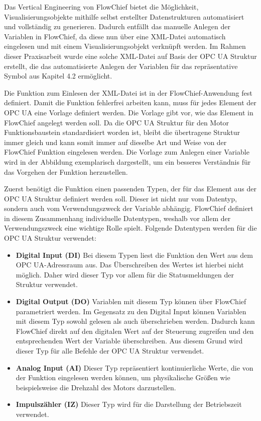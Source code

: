 Das Vertical Engineering von FlowChief bietet die Möglichkeit, Visualisierungsobjekte mithilfe selbst erstellter Datenstrukturen automatisiert und vollständig zu generieren. Dadurch entfällt das manuelle Anlegen der Variablen in FlowChief, da diese nun über eine XML-Datei automatisch eingelesen und mit einem Visualisierungsobjekt verknüpft werden. Im Rahmen dieser Praxisarbeit wurde eine solche XML-Datei auf Basis der OPC UA Struktur erstellt, die das automatisierte Anlegen der Variablen für das repräsentative Symbol aus Kapitel 4.2 ermöglicht.

Die Funktion zum Einlesen der XML-Datei ist in der FlowChief-Anwendung fest definiert. Damit die Funktion fehlerfrei arbeiten kann, muss für jedes Element der OPC UA eine Vorlage definiert werden. Die Vorlage gibt vor, wie das Element in FlowChief angelegt werden soll. Da die OPC UA Struktur für den Motor Funktionsbaustein standardisiert worden ist, bleibt die übertragene Struktur immer gleich und kann somit immer auf dieselbe Art und Weise von der FlowChief Funktion eingelesen werden. Die Vorlage zum Anlegen einer Variable wird in der Abbildung exemplarisch dargestellt, um ein besseres Verständnis für das Vorgehen der Funktion herzustellen. 

Zuerst benötigt die Funktion einen passenden Typen, der für das Element aus der OPC UA Struktur definiert werden soll. Dieser ist nicht nur vom Datentyp, sondern auch vom Verwendungszweck der Variable abhängig. FlowChief definiert in diesem Zusammenhang individuelle Datentypen, weshalb vor allem der Verwendungszweck eine wichtige Rolle spielt. Folgende Datentypen werden für die OPC UA Struktur verwendet:

\begin{itemize}
	\item \textbf{Digital Input (DI)} Bei diesem Typen liest die Funktion den Wert aus dem OPC UA-Adressraum aus. Das Überschreiben des Wertes ist hierbei nicht möglich. Daher wird dieser Typ vor allem für die Statusmeldungen der Struktur verwendet.
	\item \textbf{Digital Output (DO)} Variablen mit diesem Typ können über FlowChief parametriert werden. Im Gegensatz zu den Digital Input können Variablen mit diesem Typ sowohl gelesen als auch überschrieben werden. Dadurch kann FlowChief direkt auf den digitalen Wert auf der Steuerung zugreifen und den entsprechenden Wert der Variable überschreiben. Aus diesem Grund wird dieser Typ für alle Befehle der OPC UA Struktur verwendet.
	\item \textbf{Analog Input (AI)} Dieser Typ repräsentiert kontinuierliche Werte, die von der Funktion eingelesen werden können, um physikalische Größen wie beispielsweise die Drehzahl des Motors darzustellen.
	\item \textbf{Impulszähler (IZ)} Dieser Typ wird für die Darstellung der Betriebszeit verwendet.
	
\end{itemize}

